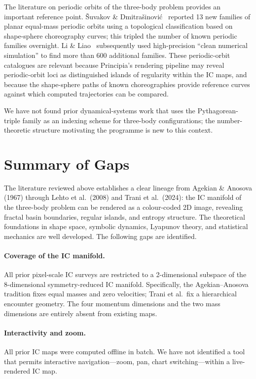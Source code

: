 \documentclass[11pt,a4paper]{article}
\begin{document}
The literature on periodic orbits of the three-body problem provides an important reference
point.  \v{S}uvakov \& Dmitra\v{s}inovi\'{c}~\cite{suvakov2013} reported 13 new families of
planar equal-mass periodic orbits using a topological classification based on shape-sphere
choreography curves; this tripled the number of known periodic families overnight.  Li \&
Liao~\cite{li2017} subsequently used high-precision ``clean numerical simulation'' to find
more than 600 additional families.  These periodic-orbit catalogues are relevant because
Principia's rendering pipeline may reveal periodic-orbit loci as distinguished islands of
regularity within the IC maps, and because the shape-sphere paths of known choreographies
provide reference curves against which computed trajectories can be compared.

We have not found prior dynamical-systems work that uses the Pythagorean-triple family as an
indexing scheme for three-body configurations; the number-theoretic structure motivating the
programme is new to this context.

\section{Summary of Gaps}

The literature reviewed above establishes a clear lineage from Agekian \& Anosova (1967) through
Lehto et al.\ (2008) and Trani et al.\ (2024): the IC manifold of the three-body problem can be
rendered as a colour-coded 2D image, revealing fractal basin boundaries, regular islands, and
entropy structure.  The theoretical foundations in shape space, symbolic dynamics, Lyapunov
theory, and statistical mechanics are well developed.  The following gaps are identified.

\paragraph{Coverage of the IC manifold.}
All prior pixel-scale IC surveys are restricted to a 2-dimensional subspace of the
8-dimensional symmetry-reduced IC manifold.  Specifically, the Agekian--Anosova tradition fixes
equal masses and zero velocities; Trani et al.\ fix a hierarchical encounter geometry.  The four
momentum dimensions and the two mass dimensions are entirely absent from existing maps.

\paragraph{Interactivity and zoom.}
All prior IC maps were computed offline in batch.  We have not identified a tool that permits
interactive navigation---zoom, pan, chart switching---within a live-rendered IC map.
\end{document}
